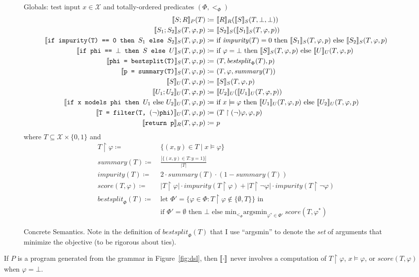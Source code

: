 \begin{figure}
\centering
Globals: test input $x \in \mathcal{X}$ and totally-ordered predicates $(\Phi, <_\Phi)$
\begin{align*}
\den[P]{S ; R}(T) \coloneqq&~
\den[R]{R}(\den[S]{S}(T, \bot, \bot)) \\
%
\den[S]{S_1 ; S_2}(T, \varphi, p) \coloneqq&~
\den[S]{S_2}(\den[S]{S_1}(T, \varphi, p)) \\
%
\den[S]{\iteimpuritynode{S_1}{S_2}}(T, \varphi, p) \coloneqq&~
\text{if } \mathit{impurity}(T) = 0 \text{ then } \den[S]{S_1}(T, \varphi, p)
\text{ else } \den[S]{S_2}(T, \varphi, p) \\
%
\den[S]{\itetrivialnode{S}{U}}(T, \varphi, p) \coloneqq&~
\text{if } \varphi = \bot \text{ then } \den[S]{S}(T, \varphi, p)
\text{ else } \den[U]{U}(T, \varphi, p) \\
%
\den[S]{\bestsplitnode}(T, \varphi, p) \coloneqq&~
(T, \mathit{bestsplit}_\Phi(T), p) \\
%
\den[S]{\summarynode}(T, \varphi, p) \coloneqq&~
(T, \varphi, \mathit{summary}(T)) \\
%
\den[U]{S}(T, \varphi, p) \coloneqq&~
\den[S]{S}(T, \varphi, p) \\
%
\den[U]{U_1 ; U_2}(T, \varphi, p) \coloneqq&~
\den[U]{U_2}(\den[U]{U_1}(T, \varphi, p)) \\
%
\den[U]{\itemodelsnode{U_1}{U_2}}(T, \varphi, p) \coloneqq&~
\text{if } x \models \varphi \text{ then } \den[U]{U_1}(T, \varphi, p)
\text{ else } \den[U]{U_2}(T, \varphi, p) \\
%
\den[U]{\filternode[(\lnot)]}(T, \varphi, p) \coloneqq&~
(T \upharpoonright (\lnot)\varphi, \varphi, p) \\
%
\den[R]{\returnnode}(T, \varphi, p) \coloneqq&~ p
\end{align*}
where $T \subseteq \mathcal{X} \times \{0,1\}$ and
\begin{align*}
T \upharpoonright \varphi \coloneqq&~ \{(x,y) \in T \mid x \models \varphi\} \\
\mathit{summary}(T) \coloneqq&~ \frac{|\{(x,y) \in T : y = 1\}|}{|T|} \\
\mathit{impurity}(T) \coloneqq&~ 2 \cdot \mathit{summary}(T) \cdot (1-\mathit{summary}(T)) \\
\mathit{score}(T, \varphi) \coloneqq&~
|T \upharpoonright \varphi| \cdot \mathit{impurity}(T \upharpoonright \varphi) +
|T \upharpoonright \lnot\varphi| \cdot \mathit{impurity}(T \upharpoonright \lnot\varphi) \\
\mathit{bestsplit}_\Phi(T) \coloneqq&~
\text{let } \Phi' = \{\varphi \in \Phi : T \upharpoonright \varphi \not\in \{\emptyset, T\}\} \text{ in } \\
&~\text{if } \Phi' = \emptyset \text{ then } \bot \text{ else }
\text{min}_{<_\Phi} \text{argsmin}_{\varphi^* \in \Phi'}~\mathit{score}(T, \varphi^*)
\end{align*}
\caption{Concrete Semantics.
Note in the definition of $\mathit{bestsplit}_\Phi(T)$
that I use ``argsmin'' to denote the \emph{set} of arguments
that minimize the objective (to be rigorous about ties).}
\label{fig:concrete}
\end{figure}

\begin{proposition}
If $P$ is a program generated from the grammar in Figure~\ref{fig:dsl},
then $\den{\cdot}$ never involves a computation of
$T \upharpoonright \varphi$, $x \models \varphi$, or $\mathit{score}(T, \varphi)$
when $\varphi = \bot$.
\end{proposition}
